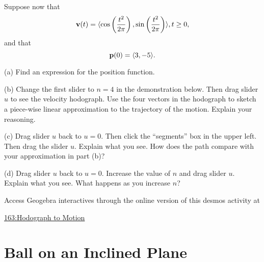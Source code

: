 \documentclass{ximera}
\begin{document}
\begin{question}  \label{Qdeggbfr4}
Suppose now that 
\[
    {\bf v}(t) = \langle \cos\left( \frac{t^2}{2\pi} \right) , \sin\left( \frac{t^2}{2\pi} \right) \rangle , t\geq 0 ,
\]
and that 
\[
{\bf p}(0) = \langle 3, -5 \rangle .
\]

(a) Find an expression for the position function.

(b) Change the first slider to $n=4$ in the demonstration below. Then drag slider $u$ to see the velocity hodograph. Use the four vectors in the hodograph to sketch a piece-wise linear approximation to the trajectory of the motion. Explain your reasoning.

(c) Drag slider $u$ back to $u=0$. Then click the ``segments'' box in the upper left. Then drag the slider $u$. Explain what you see. How does the path compare with your approximation in part (b)?

(d) Drag slider $u$ back to $u=0$. Increase the value of $n$ and drag slider $u$. Explain what you see. What happens as you increase $n$? 

\begin{exploration}

Access Geogebra interactives through the online version of this desmos activity at

\href{https://www.geogebra.org/classic/pdefd7mb}{163:Hodograph to Motion}

\begin{onlineOnly}
    \begin{center}
\end{center}
\end{onlineOnly}

\end{exploration}

\end{question}



\section{Ball on an Inclined Plane}
\end{document}
